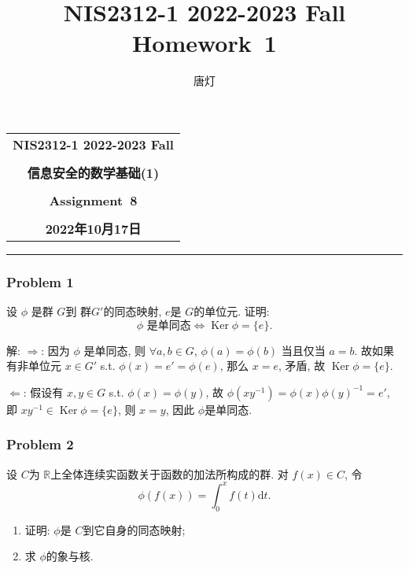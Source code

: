 \documentclass[a4paper,12pt]{ctexart}
\title{NIS2312-1 2022-2023 Fall Homework~1}
\author{唐灯}
\newcommand{\R}{\mathbb{R}}
\begin{document}
  \begin{center}

  \vspace{-0.3in}
  \begin{tabular}{c}
    \textbf{\Large NIS2312-1 2022-2023 Fall} \\
    \textbf{\Large  } \\
    \textbf{\Large  信息安全的数学基础(1)} \\
    \textbf{\Large  } \\
    \textbf{\Large  Assignment~8} \\
    \textbf{\Large  } \\
    \textbf{\Large 2022年10月17日} \\
  \end{tabular}
  \end{center}
  \noindent
  \rule{\linewidth}{0.4pt}
  

\subsubsection*{Problem 1}
  设 $ \phi $ 是群 $ G $到 群$ G' $的同态映射, $ e $是 $ G $的单位元. 证明:
  \[\phi\text{~是单同态}\Longleftrightarrow\operatorname{Ker}\phi=\{e\}.\]
  
  解: $ \Rightarrow $: 因为 $ \phi $ 是单同态, 则 $ \forall a,b\in G $, $ \phi(a)=\phi(b) $ 当且仅当 $ a=b $. 故如果有非单位元 
  $ x\in G' $ s.t. $ \phi(x)=e'=\phi(e) $, 那么 $ x=e $, 矛盾, 故 $ \operatorname{Ker}\phi=\{e\} $.

  $ \Leftarrow $: 假设有 $ x,y\in G $ s.t. $ \phi(x)=\phi(y) $, 故 $ \phi(xy^{-1})=\phi(x)\phi(y)^{-1}=e' $, 
  即 $ xy^{-1}\in \operatorname{Ker}\phi=\{e\} $, 则 $ x=y $, 因此 $ \phi $是单同态.

\subsubsection*{Problem 2} 
    设 $ C $为 $ \R $上全体连续实函数关于函数的加法所构成的群. 对 $ f(x)\in C $, 令
    \[\phi(f(x))=\int_{0}^{x}f(t)\mathrm{d} t.\]
    \begin{enumerate}[label=(\arabic{*})]
      \item 证明: $ \phi $是 $ C $到它自身的同态映射;
      \item 求 $ \phi $的象与核.
    \end{enumerate}
  
\end{document}
